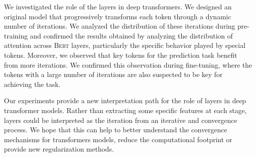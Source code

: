 We investigated the role of the layers in deep transformers. We designed an original model that progressively transforms each token through a dynamic number of iterations. We analyzed the distribution of these iterations during pre-training and confirmed the results obtained by analyzing the distribution of attention across \textsc{Bert}  layers, particularly the specific behavior played by special tokens. Moreover, we observed that key tokens for the prediction task benefit from more iterations. We confirmed this observation during fine-tuning, where the tokens with a large number of iterations are also suspected to be key for achieving the task.

Our experiments provide a new interpretation path for the role of layers in deep transformer models. Rather than extracting some specific features at each stage, layers could be interpreted as the iteration from an iterative and convergence process. We hope that this can help to better understand the convergence mechanisms for transformers models, reduce the computational footprint or provide new regularization methods.
